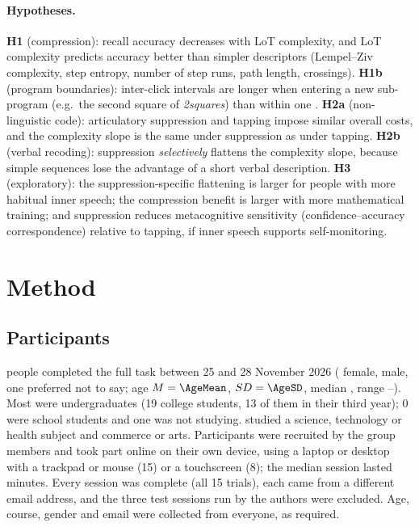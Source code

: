 \documentclass[11pt,a4paper]{article}
\providecommand{\NSchool}{0}
\begin{document}
\paragraph{Hypotheses.}
\textbf{H1} (compression): recall accuracy decreases with LoT complexity, and LoT complexity predicts accuracy better than
simpler descriptors (Lempel--Ziv complexity, step entropy, number of step runs, path length, crossings).
\textbf{H1b} (program boundaries): inter-click intervals are longer when entering a new sub-program (e.g.\ the second square of
\emph{2squares}) than within one \citep{tabbane2026humans}.
\textbf{H2a} (non-linguistic code): articulatory suppression and tapping impose similar overall costs, and the complexity slope
is the same under suppression as under tapping.
\textbf{H2b} (verbal recoding): suppression \emph{selectively} flattens the complexity slope, because simple sequences lose the
advantage of a short verbal description.
\textbf{H3} (exploratory): the suppression-specific flattening is larger for people with more habitual inner speech; the
compression benefit is larger with more mathematical training; and suppression reduces metacognitive sensitivity
(confidence--accuracy correspondence) relative to tapping, if inner speech supports self-monitoring.

\section{Method}

\subsection{Participants}
\NAll{} people completed the full task between 25 and 28 November 2026 (\NFemale{} female, \NMale{} male, one preferred not to say;
age $M = \AgeMean$, $SD = \AgeSD$, median \AgeMedian, range \AgeMin--\AgeMax). Most were undergraduates (19 college students,
13 of them in their third year); \NSchool{} were school students and one was not studying. \NStem{} studied a science,
technology or health subject and \NNonStem{} commerce or arts. Participants were recruited by the group members and took part online on their own device, using a laptop or desktop
with a trackpad or mouse (15) or a touchscreen (8); the median session lasted
\DurationMedian{} minutes. Every session was complete (all 15 trials), each came from a different email address, and the
three test sessions run by the authors were excluded. Age, course, gender and email were collected from everyone, as required.
\end{document}
